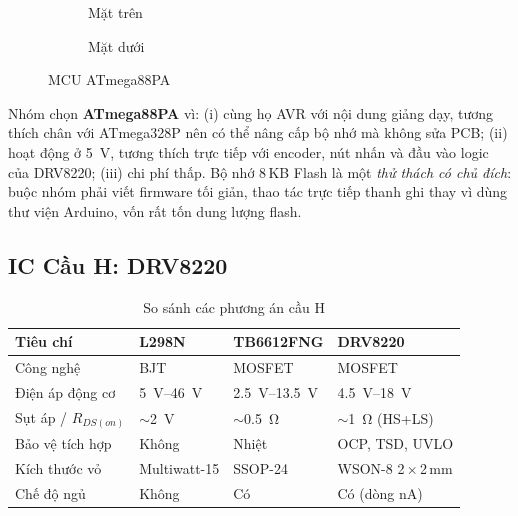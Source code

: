 \begin{figure}[H]
\centering
\begin{subfigure}{0.49\linewidth}\centering{}\caption{Mặt trên}\end{subfigure}
\hfill
\begin{subfigure}{0.49\linewidth}\centering{}\caption{Mặt dưới}\end{subfigure}
\caption{MCU ATmega88PA}
\label{fig:ATmega88PA}
\end{figure}

Nhóm chọn \textbf{ATmega88PA} vì: (i) cùng họ AVR với nội dung giảng dạy, tương thích chân với ATmega328P nên có thể nâng cấp bộ nhớ mà không sửa PCB; (ii) hoạt động ở \SI{5}{\volt}, tương thích trực tiếp với encoder, nút nhấn và đầu vào logic của DRV8220; (iii) chi phí thấp. Bộ nhớ 8\,KB Flash là một \emph{thử thách có chủ đích}: buộc nhóm phải viết firmware tối giản, thao tác trực tiếp thanh ghi thay vì dùng thư viện Arduino, vốn rất tốn dung lượng flash.

\subsection{IC Cầu H: DRV8220}
\begin{table}[H]
\centering\small
\caption{So sánh các phương án cầu H}
\label{tab:sosanh_drv}
\begin{tabularx}{\linewidth}{@{}l>{\centering\arraybackslash}X>{\centering\arraybackslash}X>{\centering\arraybackslash}X@{}}
\toprule
\textbf{Tiêu chí} & \textbf{L298N} & \textbf{TB6612FNG} & \textbf{DRV8220}\\
\midrule
Công nghệ & BJT & MOSFET & MOSFET\\
Điện áp động cơ & \SIrange{5}{46}{\volt} & \SIrange{2.5}{13.5}{\volt} & \SIrange{4.5}{18}{\volt}\\
Sụt áp / $R_{DS(on)}$ & $\sim$\SI{2}{\volt} & $\sim$\SI{0.5}{\ohm} & $\sim$\SI{1}{\ohm} (HS+LS)\\
Bảo vệ tích hợp & Không & Nhiệt & OCP, TSD, UVLO\\
Kích thước vỏ & Multiwatt-15 & SSOP-24 & WSON-8 2\,$\times$\,2\,mm\\
Chế độ ngủ & Không & Có & Có (dòng nA)\\
\bottomrule
\end{tabularx}
\end{table}

